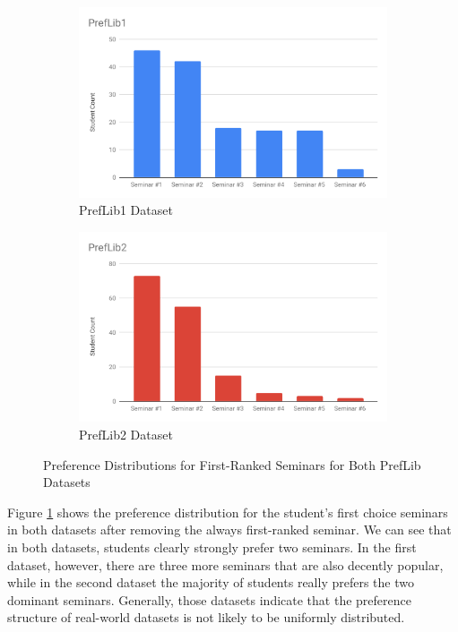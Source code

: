 \begin{figure}[h!]
  \centering
  \begin{subfigure}[b]{0.45\linewidth}
    \includegraphics[width=\linewidth]{assets/plots/preflib1-distr.pdf}
    \caption{PrefLib1 Dataset}
  \end{subfigure}
  \begin{subfigure}[b]{0.45\linewidth}
    \includegraphics[width=\linewidth]{assets/plots/preflib2-distr.pdf}
    \caption{PrefLib2 Dataset}
  \end{subfigure}
  \caption{Preference Distributions for First-Ranked Seminars for Both PrefLib Datasets}
  \label{fig:preflib-distribution}
\end{figure}

Figure \ref{fig:preflib-distribution} shows the preference distribution for the student's first choice seminars in both datasets after removing the always first-ranked seminar. We can see that in both datasets, students clearly strongly prefer two seminars. In the first dataset, however, there are three more seminars that are also decently popular, while in the second dataset the majority of students really prefers the two dominant seminars. Generally, those datasets indicate that the preference structure of real-world datasets is not likely to be uniformly distributed.


